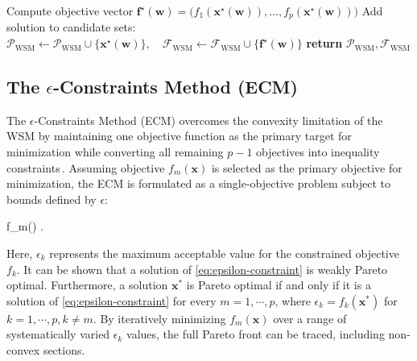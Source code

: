 \documentclass[11pt,pdflatex,sn-mathphys-ay]{sn-jnl}%
\theoremstyle{definition}
\theoremstyle{thmstyleone}%
\theoremstyle{thmstyletwo}%
\theoremstyle{thmstylethree}%
\begin{document}
\begin{appendices}
\begin{algorithm}[h!]
\begin{algorithmic}[1]
				\STATE Compute objective vector 
				$\bm{f}^{\star}(\bm{w}) = \bigl(f_1(\bm{x}^{\star}(\bm{w})),\dots,f_p(\bm{x}^{\star}(\bm{w}))\bigr)$
				\STATE Add solution to candidate sets:
				$\mathcal{P}_{\text{WSM}} \gets \mathcal{P}_{\text{WSM}} \cup \{\bm{x}^{\star}(\bm{w})\}, \quad
				\mathcal{F}_{\text{WSM}} \gets \mathcal{F}_{\text{WSM}} \cup \{\bm{f}^{\star}(\bm{w})\}$
				\ENDFOR
				\STATE \textbf{return} $\mathcal{P}_{\text{WSM}}, \mathcal{F}_{\text{WSM}}$
			\end{algorithmic}
		\end{algorithm}
		\subsection{The $\epsilon$-Constraints Method (ECM)}
		The $\epsilon$-Constraints Method (ECM) overcomes the convexity limitation of the WSM by maintaining one objective function as the primary target for minimization while converting all remaining $p-1$ objectives into inequality constraints\,\cite{haimes1971bicriterion}.
		Assuming objective $f_m(\bm{x})$ is selected as the primary objective for minimization, the ECM is formulated as a single-objective problem subject to bounds defined by $\epsilon$:
		\begin{mini!}{ \in \Omega}{f_m()}{\label{eq:epsilon-constraint}}{}
			.
		\end{mini!}
		Here, $\epsilon_k$ represents the maximum acceptable value for the constrained objective $f_k$. It can  be shown that a solution of \eqref{eq:epsilon-constraint} is weakly Pareto optimal. Furthermore, a solution $\bm{x}^*$ is Pareto optimal if and only if it is a solution of \eqref{eq:epsilon-constraint} for every $m = 1, \cdots, p$, where $\epsilon_k = f_k(\bm{x}^*)$ for $k=1, \cdots, p, k\neq m$. By iteratively minimizing $f_m(\mathbf{x})$ over a range of systematically varied $\epsilon_k$ values, the full Pareto front can be traced, including non-convex sections.
		\begin{algorithm}[h!]
			\caption{$\epsilon$-Constraint Method (ECM) for Pareto Front Generation}
			\label{alg:ecm}
			\begin{algorithmic}[1]

\end{algorithmic}
\end{algorithm}
\end{appendices}
\end{document}
